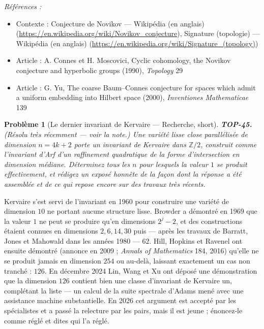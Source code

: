 \documentclass[11pt]{article}
\newtheorem{problem}{Problème}
\newenvironment{refs}{\par\small\noindent\emph{Références :}\begin{itemize}\setlength\itemsep{0pt}}{\end{itemize}\normalsize}
\begin{document}
\begin{refs}
\item Contexte : Conjecture de Novikov --- Wikipédia (en anglais) (\url{https://en.wikipedia.org/wiki/Novikov_conjecture}), Signature (topologie) --- Wikipédia (en anglais) (\url{https://en.wikipedia.org/wiki/Signature_(topology)})
\item Article : A. Connes et H. Moscovici, \og{} Cyclic cohomology, the Novikov conjecture and hyperbolic groups \fg{} (1990), \textit{Topology} 29
\item Article : G. Yu, \og{} The coarse Baum--Connes conjecture for spaces which admit a uniform embedding into Hilbert space \fg{} (2000), \textit{Inventiones Mathematicae} 139
\end{refs}

\bigskip

\begin{problem}[{Le dernier invariant de Kervaire --- Recherche, short}]
\textbf{TOP-45.} (Résolu très récemment --- voir la note.) Une variété lisse close
parallélisée de dimension $ n = 4k+2 $ porte un invariant de Kervaire dans $ \mathbb{Z}/2 $, construit
comme l'invariant d'Arf d'un raffinement quadratique de la forme d'intersection en dimension médiane.
Déterminez tous les $ n $ pour lesquels la valeur $ 1 $ se produit effectivement, et rédigez un exposé
honnête de la façon dont la réponse a été assemblée et de ce qui repose encore sur des travaux très
récents.
\end{problem}

\noindent Kervaire s'est servi de l'invariant en 1960 pour construire une variété de dimension
$ 10 $ ne portant aucune structure lisse. Browder a démontré en 1969 que la valeur $ 1 $ ne peut se
produire qu'en dimensions $ 2^{j} - 2 $, et des constructions étaient connues en dimensions
$ 2, 6, 14, 30 $ puis --- après les travaux de Barratt, Jones et Mahowald dans les années 1980 ---
$ 62 $. Hill, Hopkins et Ravenel ont ensuite démontré (annonce en 2009 ;
\textit{Annals of Mathematics} 184, 2016) qu'elle ne se produit jamais en dimension $ 254 $ ou au-delà,
laissant exactement un cas non tranché : $ 126 $. En décembre 2024 Lin, Wang et Xu ont déposé une
démonstration que la dimension $ 126 $ contient bien une classe d'invariant de Kervaire un, complétant la
liste --- un calcul de la suite spectrale d'Adams mené avec une assistance machine substantielle. En 2026 cet
argument est accepté par les spécialistes et a passé la relecture par les pairs, mais il est jeune ;
énoncez-le comme réglé et dites qui l'a réglé.
\end{document}
